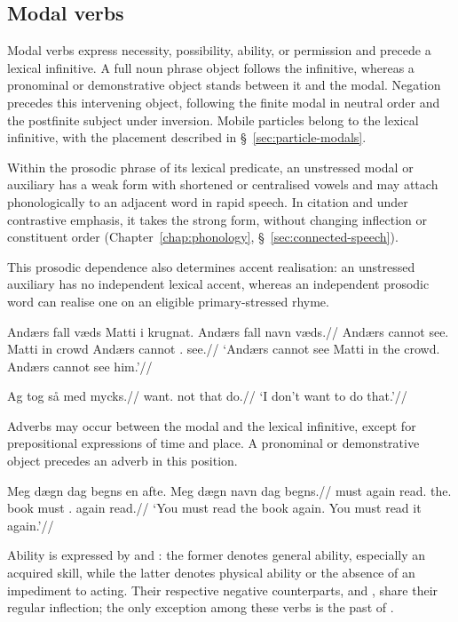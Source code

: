 \subsection{Modal verbs}
\label{sec:modal-verbs}
\label{sec:auxiliary-reduction}

Modal verbs express necessity, possibility, ability, or permission and precede a lexical infinitive. A full noun phrase object follows the infinitive, whereas a pronominal or demonstrative object stands between it and the modal. Negation precedes this intervening object, following the finite modal in neutral order and the postfinite subject under inversion. Mobile particles belong to the lexical infinitive, with the placement described in \S~\ref{sec:particle-modals}.

Within the prosodic phrase of its lexical predicate, an unstressed modal or auxiliary has a weak form with shortened or centralised vowels and may attach phonologically to an adjacent word in rapid speech. In citation and under contrastive emphasis, it takes the strong form, without changing inflection or constituent order (Chapter~\ref{chap:phonology}, \S~\ref{sec:connected-speech}).

This prosodic dependence also determines accent realisation: an unstressed auxiliary has no independent lexical accent, whereas an independent prosodic word can realise one on an eligible primary-stressed rhyme.

\pex
\begingl
\gla Andærs fall væds Matti i krugnat. Andærs fall navn væds.//
\glb Andærs cannot see.\Inf{} Matti in crowd Andærs cannot \Third{}\Sg{}.\Acc{} see.\Inf{}//
\glft `Andærs cannot see Matti in the crowd. Andærs cannot see him.'//
\endgl
\xe

\pex
\begingl
\gla Ag tog så med mycks.//
\glb \First{}\Sg{} want.\Pres{} not that do.\Inf{}//
\glft `I don't want to do that.'//
\endgl
\xe

Adverbs may occur between the modal and the lexical infinitive, except for prepositional expressions of time and place. A pronominal or demonstrative object precedes an adverb in this position.

\pex
\begingl
\gla Meg dægn dag begns en afte. Meg dægn navn dag begns.//
\glb \Second{}\Sg{} must again read.\Inf{} the.\M{} book \Second{}\Sg{} must \Third{}\Sg{}.\Acc{} again read.\Inf{}//
\glft `You must read the book again. You must read it again.'//
\endgl
\xe


Ability is expressed by  and : the former denotes general ability, especially an acquired skill, while the latter denotes physical ability or the absence of an impediment to acting. Their respective negative counterparts,  and , share their regular inflection; the only exception among these verbs is the past  of .

